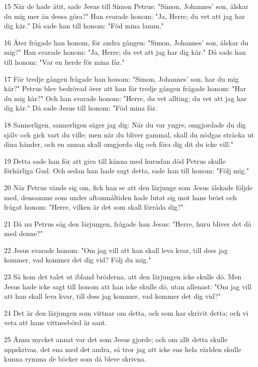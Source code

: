 \par 15 När de hade ätit, sade Jesus till Simon Petrus: "Simon, Johannes' son, älskar du mig mer än dessa göra?" Han svarade honom: "Ja, Herre; du vet att jag har dig kär." Då sade han till honom: "Föd mina lamm."
\par 16 Åter frågade han honom, för andra gången: "Simon, Johannes' son, älskar du mig?" Han svarade honom: "Ja, Herre; du vet att jag har dig kär." Då sade han till honom: "Var en herde för mina får."
\par 17 För tredje gången frågade han honom: "Simon, Johannes' son, har du mig kär?" Petrus blev bedrövad över att han för tredje gången frågade honom: "Har du mig kär?" Och han svarade honom: "Herre, du vet allting; du vet att jag har dig kär." Då sade Jesus till honom: "Föd mina får.
\par 18 Sannerligen, sannerligen säger jag dig: När du var yngre, omgjordade du dig själv och gick vart du ville; men när du bliver gammal, skall du nödgas sträcka ut dina händer, och en annan skall omgjorda dig och föra dig dit du icke vill."
\par 19 Detta sade han för att giva till känna med hurudan död Petrus skulle förhärliga Gud. Och sedan han hade sagt detta, sade han till honom: "Följ mig."
\par 20 När Petrus vände sig om, fick han se att den lärjunge som Jesus älskade följde med, densamme som under aftonmåltiden hade lutat sig mot hans bröst och frågat honom: "Herre, vilken är det som skall förråda dig?"
\par 21 Då nu Petrus såg den lärjungen, frågade han Jesus: "Herre, huru bliver det då med denne?"
\par 22 Jesus svarade honom: "Om jag vill att han skall leva kvar, till dess jag kommer, vad kommer det dig vid? Följ du mig."
\par 23 Så kom det talet ut ibland bröderna, att den lärjungen icke skulle dö. Men Jesus hade icke sagt till honom att han icke skulle dö, utan allenast: "Om jag vill att han skall leva kvar, till dess jag kommer, vad kommer det dig vid?"
\par 24 Det är den lärjungen som vittnar om detta, och som har skrivit detta; och vi veta att hans vittnesbörd är sant.
\par 25 Ännu mycket annat var det som Jesus gjorde; och om allt detta skulle uppskrivas, det ena med det andra, så tror jag att icke ens hela världen skulle kunna rymma de böcker som då bleve skrivna.


